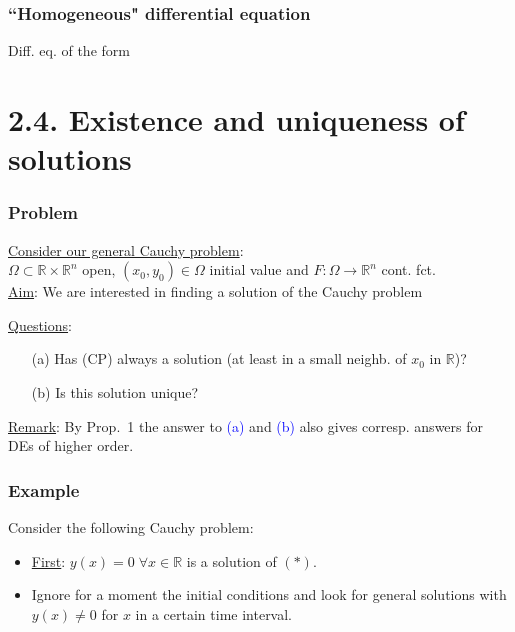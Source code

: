 \documentclass[10pt]{beamer}
\newcommand{\R}{\mathbb{R}}
\begin{document}
{\begin{frame}\frametitle{``Homogeneous" differential equation}
Diff. eq. of the form
\begin{block}{}
\vspace{0.5cm}
\end{block}
\vspace{3cm}
\end{frame}


\section{2.4. Existence and uniqueness of solutions}

\begin{frame}\frametitle{Problem}
\underline{Consider our general Cauchy problem}:\\
\vspace{0.2cm}
$\Omega \subset \R \times \R^n$ open,  $(x_0,y_0) \in \Omega$ initial value and $F: \Omega \rightarrow \R^n$ cont. fct.\\
\vspace{0.2cm}
\underline{Aim}: We are interested in finding a solution of the Cauchy problem
\begin{block}{}
\vspace{1cm}
\end{block}
\underline{Questions}:
\begin{itemize}
\item[(a)] Has (CP) always a solution (at least in a small neighb. of $x_0$ in $\R$)?
\item[(b)] Is this solution unique?
\end{itemize}
\vspace{0.2cm}
\underline{Remark}: By Prop.~1 the answer to \textcolor{blue}{(a)} and \textcolor{blue}{(b)} also gives corresp. answers for DEs of higher order.
\end{frame}

\begin{frame}\frametitle{Example}
Consider the following Cauchy problem:\\
\begin{block}{}
\vspace{1.5cm}
\end{block}
\begin{itemize}
\item \underline{First}: $y(x)=0\; \forall x\in \R$ is a solution of $(*)$.\\
\item Ignore for a moment the initial conditions and look for general solutions with \underline{$y(x) \neq 0$} for $x$ in a certain time interval.
\end{itemize}
\vspace{4cm}
\end{frame}

}
\end{document}
